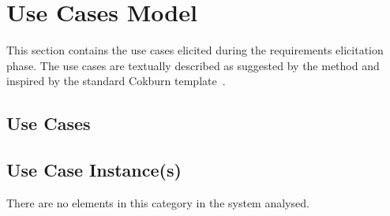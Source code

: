 \section{Use Cases Model}
\label{sec:lu.uni.lassy.excalibur.group01.excalibur-gendescr-usecasemodel}

This section contains the use cases elicited during the requirements elicitation phase.
The use cases are textually described as suggested by the \msrmessir method and inspired by the standard Cokburn template~\cite{armour01usecase}.


\subsection{Use Cases}















\pagebreak
\subsection{Use Case Instance(s)}

There are no elements in this category in the system analysed.

